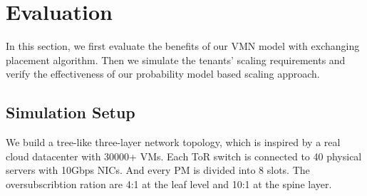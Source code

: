\documentclass[review]{elsarticle}
\begin{document}
\section{Evaluation}\label{sec:simulation}

In this section, we first evaluate the benefits of our VMN model with exchanging placement algorithm. Then we simulate the tenants' scaling requirements and verify the effectiveness of our probability model based scaling approach.





\subsection{Simulation Setup}
We build a tree-like three-layer network topology, which is inspired by a real cloud datacenter with 30000+ VMs. Each ToR switch is connected to 40 physical servers with 10Gbps NICs. And every PM is divided into 8 slots. The oversubscribtion ration are 4:1 at the leaf level and 10:1 at the spine layer.  




\end{document}
